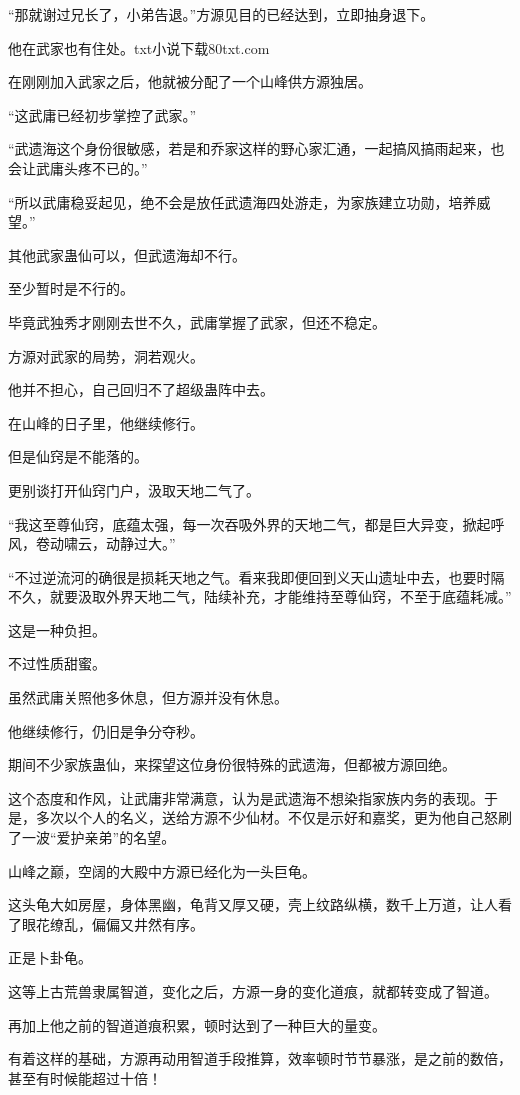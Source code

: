 \begin{this_body}
“那就谢过兄长了，小弟告退。”方源见目的已经达到，立即抽身退下。

他在武家也有住处。txt小说下载80txt.com

在刚刚加入武家之后，他就被分配了一个山峰供方源独居。

“这武庸已经初步掌控了武家。”

“武遗海这个身份很敏感，若是和乔家这样的野心家汇通，一起搞风搞雨起来，也会让武庸头疼不已的。”

“所以武庸稳妥起见，绝不会是放任武遗海四处游走，为家族建立功勋，培养威望。”

其他武家蛊仙可以，但武遗海却不行。

至少暂时是不行的。

毕竟武独秀才刚刚去世不久，武庸掌握了武家，但还不稳定。

方源对武家的局势，洞若观火。

他并不担心，自己回归不了超级蛊阵中去。

在山峰的日子里，他继续修行。

但是仙窍是不能落的。

更别谈打开仙窍门户，汲取天地二气了。

“我这至尊仙窍，底蕴太强，每一次吞吸外界的天地二气，都是巨大异变，掀起呼风，卷动啸云，动静过大。”

“不过逆流河的确很是损耗天地之气。看来我即便回到义天山遗址中去，也要时隔不久，就要汲取外界天地二气，陆续补充，才能维持至尊仙窍，不至于底蕴耗减。”

这是一种负担。

不过性质甜蜜。

虽然武庸关照他多休息，但方源并没有休息。

他继续修行，仍旧是争分夺秒。

期间不少家族蛊仙，来探望这位身份很特殊的武遗海，但都被方源回绝。

这个态度和作风，让武庸非常满意，认为是武遗海不想染指家族内务的表现。于是，多次以个人的名义，送给方源不少仙材。不仅是示好和嘉奖，更为他自己怒刷了一波“爱护亲弟”的名望。

山峰之巅，空阔的大殿中方源已经化为一头巨龟。

这头龟大如房屋，身体黑幽，龟背又厚又硬，壳上纹路纵横，数千上万道，让人看了眼花缭乱，偏偏又井然有序。

正是卜卦龟。

这等上古荒兽隶属智道，变化之后，方源一身的变化道痕，就都转变成了智道。

再加上他之前的智道道痕积累，顿时达到了一种巨大的量变。

有着这样的基础，方源再动用智道手段推算，效率顿时节节暴涨，是之前的数倍，甚至有时候能超过十倍！


\end{this_body}
